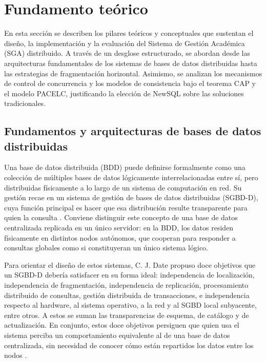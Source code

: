 \documentclass[10pt,a4paper]{article}
\begin{document}
\section{Fundamento teórico}

En esta sección se describen los pilares teóricos y conceptuales que sustentan el diseño, la implementación y la evaluación del 
Sistema de Gestión Académica (SGA) distribuido. A través de un desglose estructurado, se abordan desde las arquitecturas fundamentales 
de los sistemas de bases de datos distribuidas hasta las estrategias de fragmentación horizontal. Asimismo, se analizan los mecanismos 
de control de concurrencia y los modelos de consistencia bajo el teorema CAP y el modelo PACELC, justificando la elección de NewSQL 
sobre las soluciones tradicionales.

\subsection{Fundamentos y arquitecturas de bases de datos distribuidas}

Una base de datos distribuida (BDD) puede definirse formalmente como una colección de
múltiples bases de datos lógicamente interrelacionadas entre sí, pero distribuidas
físicamente a lo largo de un sistema de computación en red. Su gestión recae en un
sistema de gestión de bases de datos distribuidas (SGBD-D), cuya función principal es
hacer que esa distribución resulte transparente para quien la consulta
\cite{ozsu2020,kleppmann2017}. Conviene distinguir este concepto de una base de datos
centralizada replicada en un único servidor: en la BDD, los datos residen físicamente
en distintos nodos autónomos, que cooperan para responder a consultas globales como si
constituyeran un único sistema lógico.

Para orientar el diseño de estos sistemas, C. J. Date propuso doce objetivos que un
SGBD-D debería satisfacer en su forma ideal: independencia de localización,
independencia de fragmentación, independencia de replicación, procesamiento
distribuido de consultas, gestión distribuida de transacciones, e independencia
respecto al hardware, al sistema operativo, a la red y al SGBD local subyacente, entre
otros. A estos se suman las transparencias de esquema, de catálogo y de actualización.
En conjunto, estos doce objetivos persiguen que quien usa el sistema perciba un
comportamiento equivalente al de una base de datos centralizada, sin necesidad de
conocer cómo están repartidos los datos entre los nodos \cite{ozsu2020}.
\end{document}
